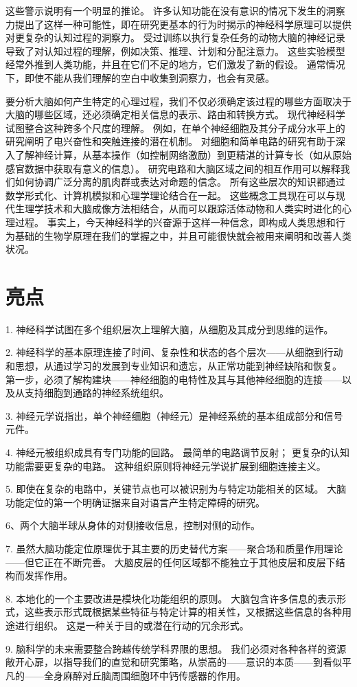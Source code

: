 这些警示说明有一个明显的推论。 
许多认知功能在没有意识的情况下发生的洞察力提出了这样一种可能性，即在研究更基本的行为时揭示的神经科学原理可以提供对更复杂的认知过程的洞察力。 
受过训练以执行复杂任务的动物大脑的神经记录导致了对认知过程的理解，例如决策、推理、计划和分配注意力。 
这些实验模型经常外推到人类功能，并且在它们不足的地方，它们激发了新的假设。 
通常情况下，即使不能从我们理解的空白中收集到洞察力，也会有灵感。


要分析大脑如何产生特定的心理过程，我们不仅必须确定该过程的哪些方面取决于大脑的哪些区域，还必须确定相关信息的表示、路由和转换方式。 
现代神经科学试图整合这种跨多个尺度的理解。 
例如，在单个神经细胞及其分子成分水平上的研究阐明了电兴奋性和突触连接的潜在机制。 
对细胞和简单电路的研究有助于深入了解神经计算，从基本操作（如控制网络激励）到更精湛的计算专长（如从原始感官数据中获取有意义的信息）。 
研究电路和大脑区域之间的相互作用可以解释我们如何协调广泛分离的肌肉群或表达对命题的信念。 
所有这些层次的知识都通过数学形式化、计算机模拟和心理学理论结合在一起。 
这些概念工具现在可以与现代生理学技术和大脑成像方法相结合，从而可以跟踪活体动物和人类实时进化的心理过程。 
事实上，今天神经科学的兴奋源于这样一种信念，即构成人类思想和行为基础的生物学原理在我们的掌握之中，并且可能很快就会被用来阐明和改善人类状况。




\section{亮点}

1. 神经科学试图在多个组织层次上理解大脑，从细胞及其成分到思维的运作。

2. 神经科学的基本原理连接了时间、复杂性和状态的各个层次——从细胞到行动和思想，从通过学习的发展到专业知识和遗忘，从正常功能到神经缺陷和恢复。 
第一步，必须了解构建块——神经细胞的电特性及其与其他神经细胞的连接——以及从支持细胞到通路的神经系统组织。


3. 神经元学说指出，单个神经细胞（神经元）是神经系统的基本组成部分和信号元件。

4. 神经元被组织成具有专门功能的回路。 
最简单的电路调节反射； 更复杂的认知功能需要更复杂的电路。 
这种组织原则将神经元学说扩展到细胞连接主义。


5. 即使在复杂的电路中，关键节点也可以被识别为与特定功能相关的区域。 
大脑功能定位的第一个明确证据来自对语言产生特定障碍的研究。


6、两个大脑半球从身体的对侧接收信息，控制对侧的动作。

7. 虽然大脑功能定位原理优于其主要的历史替代方案——聚合场和质量作用理论——但它正在不断完善。 
大脑皮层的任何区域都不能独立于其他皮层和皮层下结构而发挥作用。

8. 本地化的一个主要改进是模块化功能组织的原则。 大脑包含许多信息的表示形式，这些表示形式既根据某些特征与特定计算的相关性，又根据这些信息的各种用途进行组织。 
这是一种关于目的或潜在行动的冗余形式。


9. 脑科学的未来需要整合跨越传统学科界限的思想。 
我们必须对各种各样的资源敞开心扉，以指导我们的直觉和研究策略，从崇高的——意识的本质——到看似平凡的——全身麻醉对丘脑周围细胞环中钙传感器的作用。



